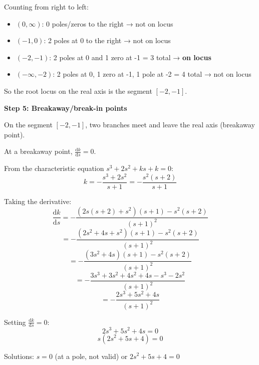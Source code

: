 \documentclass[11pt,a4paper]{article}
\begin{document}
Counting from right to left:
\begin{itemize}
  \item $(0, \infty)$: 0 poles/zeros to the right → not on locus
  \item $(-1, 0)$: 2 poles at 0 to the right → not on locus
  \item $(-2, -1)$: 2 poles at 0 and 1 zero at -1 = 3 total → \textbf{on locus}
  \item $(-\infty, -2)$: 2 poles at 0, 1 zero at -1, 1 pole at -2 = 4 total → not on locus
\end{itemize}

So the root locus on the real axis is the segment $[-2, -1]$.

\textbf{Step 5: Breakaway/break-in points}

On the segment $[-2, -1]$, two branches meet and leave the real axis (breakaway point).

At a breakaway point, $\frac{\mathrm{d}k}{\mathrm{d}s} = 0$.

From the characteristic equation $s^3 + 2s^2 + ks + k = 0$:
\begin{equation}
  k = -\frac{s^3 + 2s^2}{s + 1} = -\frac{s^2(s + 2)}{s + 1}
\end{equation}

Taking the derivative:
\begin{equation}
  \frac{\mathrm{d}k}{\mathrm{d}s} = -\frac{(2s(s+2) + s^2)(s+1) - s^2(s+2)}{(s+1)^2}
\end{equation}
\begin{equation}
  = -\frac{(2s^2 + 4s + s^2)(s+1) - s^2(s+2)}{(s+1)^2}
\end{equation}
\begin{equation}
  = -\frac{(3s^2 + 4s)(s+1) - s^2(s+2)}{(s+1)^2}
\end{equation}
\begin{equation}
  = -\frac{3s^3 + 3s^2 + 4s^2 + 4s - s^3 - 2s^2}{(s+1)^2}
\end{equation}
\begin{equation}
  = -\frac{2s^3 + 5s^2 + 4s}{(s+1)^2}
\end{equation}

Setting $\frac{\mathrm{d}k}{\mathrm{d}s} = 0$:
\begin{equation}
  2s^3 + 5s^2 + 4s = 0
\end{equation}
\begin{equation}
  s(2s^2 + 5s + 4) = 0
\end{equation}

Solutions: $s = 0$ (at a pole, not valid) or $2s^2 + 5s + 4 = 0$
\end{document}
